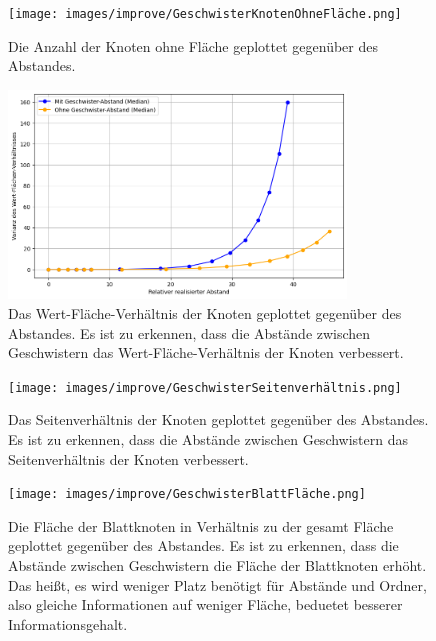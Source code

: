 
\begin{figure}
    \centering
    \texttt{[image: images/improve/GeschwisterKnotenOhneFläche.png]}
    \caption{Die Anzahl der Knoten ohne Fläche geplottet gegenüber des Abstandes.}
    \label{fig:GeschwisterKnotenOhneFläche}
\end{figure}

\begin{figure}
    \centering
    \includegraphics[width=0.8\textwidth]{images/improve/GeschwisterWertFlächeVerhältnis.png}
    \caption{Das Wert-Fläche-Verhältnis der Knoten geplottet gegenüber des Abstandes. Es ist zu erkennen, dass die Abstände zwischen Geschwistern das Wert-Fläche-Verhältnis der Knoten verbessert.}
    \label{fig:GeschwisterKnotenWertFlächeVerhältnis}
\end{figure}

\begin{figure}
    \centering
    \texttt{[image: images/improve/GeschwisterSeitenverhältnis.png]}
    \caption{Das Seitenverhältnis der Knoten geplottet gegenüber des Abstandes. Es ist zu erkennen, dass die Abstände zwischen Geschwistern das Seitenverhältnis der Knoten verbessert.}
    \label{fig:GeschwisterKnotenSeitenverhältnis}
\end{figure}

\begin{figure}
    \centering
    \texttt{[image: images/improve/GeschwisterBlattFläche.png]}
    \caption{Die Fläche der Blattknoten in Verhältnis zu der gesamt Fläche geplottet gegenüber des Abstandes. Es ist zu erkennen, dass die Abstände zwischen Geschwistern die Fläche der Blattknoten erhöht. Das heißt, es wird weniger Platz benötigt für Abstände und Ordner, also gleiche Informationen auf weniger Fläche, beduetet besserer Informationsgehalt.}
    \label{fig:GeschwisterKnotenBlattFläche}
\end{figure}

